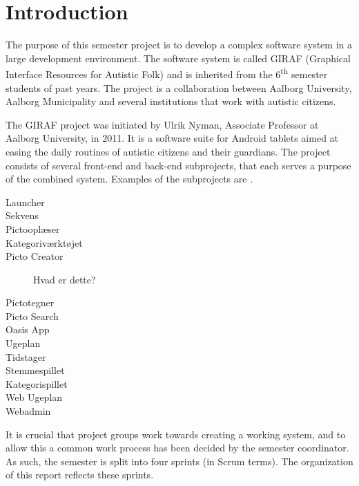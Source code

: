 \chapter{Introduction}

The purpose of this semester project is to develop a complex software system in a large development environment. The software system is called GIRAF (Graphical Interface Resources for Autistic Folk) and is inherited from the 6\textsuperscript{th} semester students of past years. The project is a collaboration between Aalborg University, Aalborg Municipality and several institutions that work with autistic citizens. 

The GIRAF project was initiated by Ulrik Nyman, Associate Professor at Aalborg University, in 2011. It is a software suite for Android tablets aimed at easing the daily routines of autistic citizens and their guardians. The project consists of several front-end and back-end subprojects, that each serves a purpose of the combined system. Examples of the subprojects are .

\begin{description}
  \item[Launcher] \dummy
  \item[Sekvens]
  \item[Pictooplæser]
	\item[Kategoriværktøjet] \dummy
  \item[Picto Creator] Hvad er dette?
  \item[Pictotegner]
  \item[Picto Search] \dummy
  \item[Oasis App]
  \item[Ugeplan]
  \item[Tidstager] 
  \item[Stemmespillet]
  \item[Kategorispillet]
  \item[Web Ugeplan]
  \item[Webadmin]
\end{description}


It is crucial that project groups work towards creating a working system, and to allow this a common work process has been decided by the semester coordinator. As such, the semester is split into four sprints (in Scrum terms). The organization of this report reflects these sprints. 

